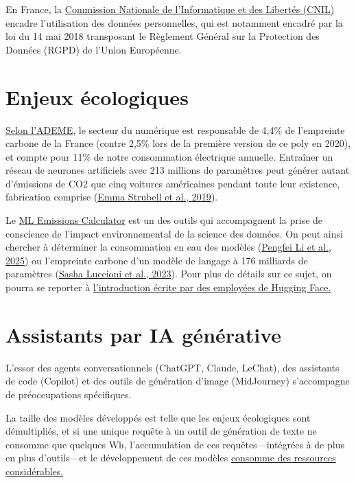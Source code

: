 En France, la \href{https://www.cnil.fr/}{Commission Nationale de
  l'Informatique et des Libertés (CNIL)} encadre l'utilisation des données
personnelles, qui est notamment encadré par la loi du 14 mai 2018 transposant
le Règlement Général sur la Protection des Données (RGPD) de l'Union
Européenne.


\section{Enjeux écologiques}
\label{sec:ecology}
\href{https://ecoresponsable.numerique.gouv.fr/actualites/actualisation-ademe-impact/}{Selon
  l'ADEME}, le secteur du numérique est responsable de 4,4\% de l'empreinte
carbone de la France (contre 2,5\% lors de la première version de ce poly en
2020), et compte pour 11\% de notre consommation électrique annuelle. Entraîner
un réseau de neurones artificiels avec 213 millions de paramètres peut générer
autant d'émissions de CO2 que cinq voitures américaines pendant toute leur
existence, fabrication comprise (\href{https://aclanthology.org/P19-1355/}{Emma
  Strubell et al., 2019}).

Le \href{https://mlco2.github.io/impact/}{ML Emissions Calculator} est un des
outils qui accompagnent la prise de conscience de l'impact environnemental de
la science des données. On peut ainsi chercher à déterminer la consommation en
eau des modèles (\href{https://arxiv.org/abs/2304.03271}{Pengfei Li et al.,
  2025}) ou l'empreinte carbone d'un modèle de langage à 176 milliards de
paramètres (\href{https://jmlr.org/papers/v24/23-0069.html}{Sasha Luccioni et
  al., 2023}). Pour plus de détails sur ce sujet, on pourra se reporter à
\href{https://huggingface.co/blog/sasha/ai-environment-primer}{l'introduction
  écrite par des employées de Hugging Face.}

\section{Assistants par IA générative}
L'essor des agents conversationnels (ChatGPT, Claude, LeChat), des assistants de code (Copilot) et des outils de génération d'image (MidJourney) s'accompagne de préoccupations spécifiques.

La taille des modèles développés est telle que les enjeux écologiques sont démultipliés, et si une unique requête à un outil de génération de texte ne consomme que quelques Wh, l'accumulation de ces requêtes---intégrées à de plus en plus d'outils---et le développement de ces modèles \href{https://www.technologyreview.com/2025/05/20/1116327/ai-energy-usage-climate-footprint-big-tech/}{consomme des ressources considérables.}

